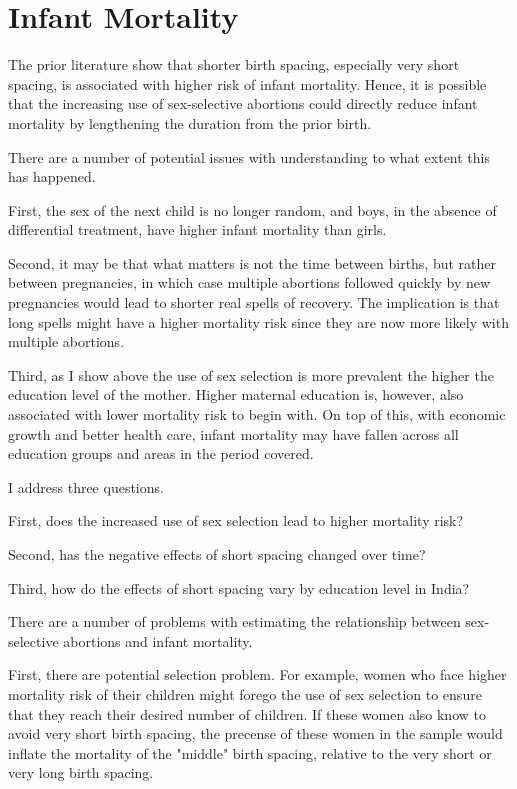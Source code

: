 \section{Infant Mortality}

The prior literature show that shorter birth spacing, especially very short spacing,
is associated with higher risk of infant mortality.
Hence, it is possible that the increasing use of sex-selective abortions could
directly reduce infant mortality by lengthening the duration from the prior birth.

There are a number of potential issues with understanding to what extent this
has happened.

First, the sex of the next child is no longer random, and boys, in the absence of
differential treatment, have higher infant mortality than girls.

Second, it may be that what matters is not the time between births, but rather 
between pregnancies, in which case multiple abortions followed quickly by new 
pregnancies would lead to shorter real spells of recovery.
The implication is that long spells might have a higher mortality risk since
they are now more likely with multiple abortions.

Third, as I show above the use of sex selection is more prevalent the higher the
education level of the mother.
Higher maternal education is, however, also associated with lower mortality risk
to begin with.
On top of this, with economic growth and better health care, infant mortality
may have fallen across all education groups and areas in the period covered.

I address three questions.

First, does the increased use of sex selection lead to higher mortality risk?

Second, has the negative effects of short spacing changed over time?

Third, how do the effects of short spacing vary by education level in India?


There are a number of problems with estimating the relationship between 
sex-selective abortions and infant mortality.

First, there are potential selection problem.
For example, women who face higher mortality risk of their children might forego 
the use of sex selection to ensure that they reach their desired number of 
children.
If these women also know to avoid very short birth spacing, the precense of 
these women in the sample would inflate the mortality of the "middle" birth
spacing, relative to the very short or very long birth spacing.

